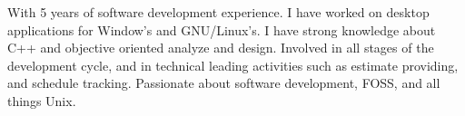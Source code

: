 

\begin{cvparagraph}

With 5 years of software development experience. I have worked on desktop applications for Window’s and GNU/Linux’s. I have strong knowledge about C++ and objective oriented analyze and design. Involved in all stages of the development cycle, and in technical leading activities such as estimate providing, and schedule tracking. Passionate about software development, FOSS, and all things Unix.

\end{cvparagraph}
